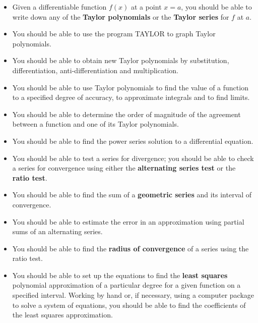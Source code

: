 \begin{itemize}

\item Given a differentiable function $f(x)$ at a point $x=a$, you
  should be able to write down any of the {\bf Taylor polynomials} or
  the {\bf Taylor series} for $f$ at $a$.

\item You should be able to use the program TAYLOR to graph Taylor
  polynomials.

\item You should be able to obtain new Taylor polynomials by
  substitution, differentiation, anti-differentiation and
  multiplication.

\item You should be able to use Taylor polynomials to find the value
  of a function to a specified degree of accuracy, to approximate
  integrals and to find limits.

\item You should be able to determine the order of magnitude of the
  agreement between a function and one of its Taylor polynomials.

\item You should be able to find the power series solution to a
  differential equation.

\item You should be able to test a series for divergence; you should
  be able to check a series for convergence using either the {\bf
    alternating series test} or the {\bf ratio test}.

\item You should be able to find the sum of a {\bf geometric series}
  and its interval of convergence.

\item You should be able to estimate the error in an approximation
  using partial sums of an alternating series.

\item You should be able to find the {\bf radius of convergence} of a
  series using the ratio test.

\item You should be able to set up the equations to find the {\bf
  least squares} polynomial approximation of a particular degree for a
  given function on a specified interval.  Working by hand or, if
  necessary, using a computer package to solve a system of equations,
  you should be able to find the coefficients of the least squares
  approximation.

\end{itemize}



\cleardoublepage
